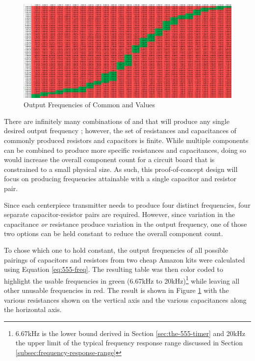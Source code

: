 \begin{figure}
    \centering
    \caption{Output Frequencies of Common  and  Values}
    \label{fig:freq-selection}
    \includegraphics[width=\linewidth]{Figures/6 PCB Design/freq_selection.png}
\end{figure}

There are infinitely many combinations of  and  that
will produce any single desired output frequency ; however, the
set of resistances and capacitances of commonly produced resistors and
capacitors is finite. While multiple components can be combined to
produce more specific resistances and capacitances, doing so would
increase the overall component count for a circuit board that is
constrained to a small physical size. As such, this proof-of-concept
design will focus on producing frequencies attainable with a single
capacitor and resistor pair.

Since each centerpiece transmitter needs to produce four distinct
frequencies, four separate capacitor-resistor pairs are required.
However, since variation in the capacitance \emph{or} resistance
produce variation in the output frequency, one of those two options can
be held constant to reduce the overall component count.

To chose which one to hold constant, the output frequencies of all
possible pairings of capacitors and resistors from two cheap Amazon
kits \cite{amazon-resistors} \cite{amazon-capacitors} were calculated
using Equation \ref{eq:555-freq}. The resulting table was then color
coded to highlight the usable frequencies in green (6.67kHz to
20kHz)\footnote{6.67kHz is the lower bound derived in Section
\ref{sec:the-555-timer} and 20kHz the upper limit of the typical
frequency response range discussed in Section
\ref{subsec:frequency-response-range}} while leaving all other unusable
frequencies in red. The result is shown in Figure
\ref{fig:freq-selection} with the various resistances shown on the
vertical axis and the various capacitances along the horizontal axis.

